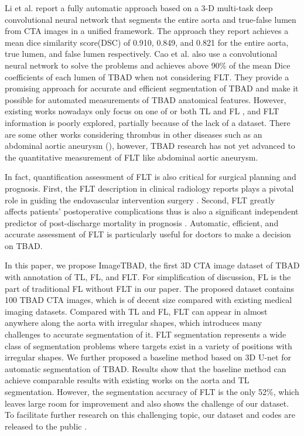 \documentclass{article}
\begin{document}
%
Li et al. report a fully automatic approach based on a 3-D multi-task deep convolutional neural network that segments the entire aorta and true-false lumen from CTA images in a unified framework.
The approach they report achieves a mean dice similarity score(DSC) of 0.910, 0.849, and 0.821 for the entire aorta, true lumen, and false lumen respectively.
%
Cao et al. also use a convolutional neural network to solve the problems and achieves above 90\% of the mean Dice coefficients of each lumen of TBAD when not considering FLT.
They provide a promising approach for accurate and efficient segmentation of TBAD and make it possible for automated measurements of TBAD anatomical features.
However, existing works nowadays only focus on one of or both TL and FL \cite{melito2019reliability,gamechi2019automated,li2018multi,cao2019fully}, 
and FLT information is poorly explored, partially because of the lack of a dataset.
%
There are some other works considering thrombus in other diseases such as an abdominal aortic aneurysm (\cite{Lisowska2017ThrombusDI,Yong2017LinearregressionCN,Lopez-Linares2018}),
however, TBAD research has not yet advanced to the quantitative measurement of FLT like abdominal aortic aneurysm. 



In fact, quantification assessment of FLT is also critical for surgical planning and prognosis.
First, the FLT description in clinical radiology reports plays a pivotal role in guiding the endovascular intervention surgery \cite{Dohle2017TheIO}.
Second, FLT greatly affects patients' postoperative complications \cite{Higashigaito2019AorticGA} thus is also a significant independent predictor of post-discharge mortality in prognosis \cite{Higashigaito2019AorticGA,Trimarchi2013ImportanceOF}.
Automatic, efficient, and accurate assessment of FLT is particularly useful for doctors to make a decision on TBAD.

In this paper, we propose ImageTBAD, the first 3D CTA image dataset of TBAD with annotation of TL, FL, and FLT.
For simplification of discussion, FL is the part of traditional FL without FLT in our paper.
The proposed dataset contains 100 TBAD CTA images, which is of decent size compared with existing medical imaging datasets.
Compared with TL and FL, FLT can appear in almost anywhere along the aorta with irregular shapes, which introduces many challenges to accurate segmentation of it.
FLT segmentation represents a wide class of segmentation problems where targets exist in a variety of positions with irregular shapes.
We further proposed a baseline method based on 3D U-net \cite{cciccek20163d} for automatic segmentation of TBAD.
Results show that the baseline method can achieve comparable results with existing works on the aorta and TL segmentation.
However, the segmentation accuracy of FLT is the only 52\%, which leaves large room for improvement and also shows the challenge of our dataset.
To facilitate further research on this challenging topic, our dataset and codes are released to the public \cite{ourdataset}.
\end{document}
